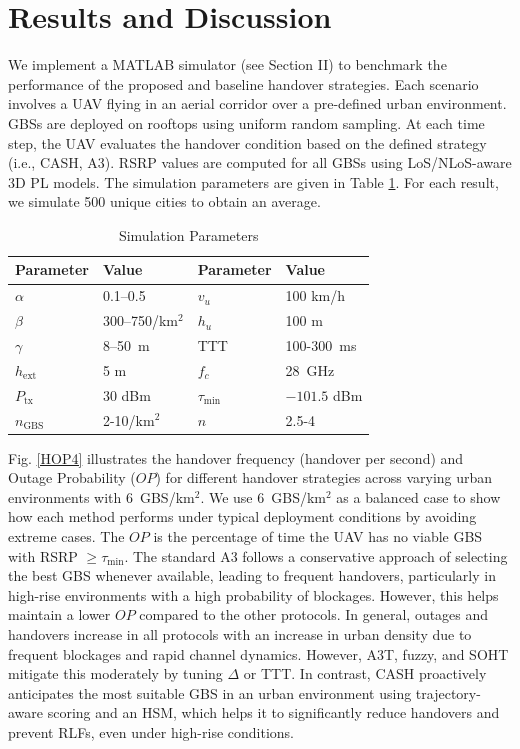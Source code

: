 \documentclass[conference]{IEEEtran}
\begin{document}
\section{Results and Discussion}
We implement a MATLAB simulator (see Section II) to benchmark the performance of the proposed and baseline handover strategies. Each scenario involves a UAV flying in an aerial corridor over a pre-defined urban environment. GBSs are deployed on rooftops using uniform random sampling. At each time step, the UAV evaluates the handover condition based on the defined strategy (i.e., CASH, A3). RSRP values are computed for all GBSs using LoS/NLoS-aware 3D PL models. The simulation parameters are given in Table \ref{simparams}. For each result, we simulate 500 unique cities to obtain an average.


\begin{table}[t]
\caption{Simulation Parameters}
\centering
\begin{tabular}{|p{1.5cm}|p{1.5cm}|p{2cm}|p{2cm}|}
\hline
\textbf{Parameter} & \textbf{Value} & \textbf{Parameter} & \textbf{Value} \\
\hline
$\alpha$ & 0.1–0.5 & $v_u$ & 100 km/h \\ \hline
$\beta$ & 300–750/km$^2$ & $h_u$ & 100 m \\ \hline
$\gamma$ & 8–50~m & TTT & 100-300~ms \\ \hline
$h_{\text{ext}}$ & 5 m & $f_c$ & 28~GHz \\ \hline
$P_{\mathrm{tx}}$ & 30 dBm & $\tau_{\min}$ & $-101.5$ dBm \\ \hline
$n_{\text{GBS}}$ & 2-10/km$^2$ & $n$ & 2.5-4 \\ \hline
\end{tabular}
\label{simparams}
\vspace{-.5cm}
\end{table}

Fig. \ref{HOP4} illustrates the handover frequency (handover per second) and Outage Probability ($OP$) for different handover strategies across varying urban environments with 6~GBS/km$^2$. We use 6~GBS/km$^2$ as a balanced case to show how each method performs under typical deployment conditions by avoiding extreme cases.  The $OP$ is the percentage of time the UAV has no viable GBS with RSRP $\geq \tau_{\min}$. The standard A3 follows a conservative approach of selecting the best GBS whenever available, leading to frequent handovers, particularly in high-rise environments with a high probability of blockages. However, this helps maintain a lower $OP$ compared to the other protocols. In general, outages and handovers increase in all protocols with an increase in urban density due to frequent blockages and rapid channel dynamics. However, A3T, fuzzy, and SOHT mitigate this moderately by tuning $\Delta$ or TTT. In contrast, CASH proactively anticipates the most suitable GBS in an urban environment using trajectory-aware scoring and an HSM, which helps it to significantly reduce handovers and prevent RLFs, even under high-rise conditions.
\end{document}
